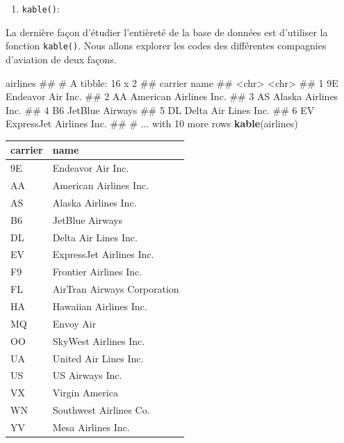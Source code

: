 \documentclass[]{book}
\newenvironment{Shaded}{\begin{snugshade}}{\end{snugshade}}
\newcommand{\KeywordTok}[1]{\textcolor[rgb]{0.13,0.29,0.53}{\textbf{#1}}}
\newcommand{\NormalTok}[1]{#1}
\providecommand{\tightlist}{%
  \setlength{\itemsep}{0pt}\setlength{\parskip}{0pt}}
\theoremstyle{definition}
\theoremstyle{definition}
\theoremstyle{definition}
\theoremstyle{remark}
\begin{document}
\begin{enumerate}
\def\labelenumi{\arabic{enumi}.}
\setcounter{enumi}{2}
\tightlist
\item
  \texttt{kable()}:
\end{enumerate}

La dernière façon d'étudier l'entièreté de la base de données est
d'utiliser la fonction \texttt{kable()}. Nous allons explorer les codes
des différentes compagnies d'aviation de deux façons.

\begin{Shaded}
\begin{Highlighting}[]
\NormalTok{airlines}
\NormalTok{## # A tibble: 16 x 2}
\NormalTok{##   carrier name                    }
\NormalTok{##   <chr>   <chr>                   }
\NormalTok{## 1 9E      Endeavor Air Inc.       }
\NormalTok{## 2 AA      American Airlines Inc.  }
\NormalTok{## 3 AS      Alaska Airlines Inc.    }
\NormalTok{## 4 B6      JetBlue Airways         }
\NormalTok{## 5 DL      Delta Air Lines Inc.    }
\NormalTok{## 6 EV      ExpressJet Airlines Inc.}
\NormalTok{## # ... with 10 more rows}
\KeywordTok{kable}\NormalTok{(airlines)}
\end{Highlighting}
\end{Shaded}

\begin{tabular}{l|l}
\hline
carrier & name\\
\hline
9E & Endeavor Air Inc.\\
\hline
AA & American Airlines Inc.\\
\hline
AS & Alaska Airlines Inc.\\
\hline
B6 & JetBlue Airways\\
\hline
DL & Delta Air Lines Inc.\\
\hline
EV & ExpressJet Airlines Inc.\\
\hline
F9 & Frontier Airlines Inc.\\
\hline
FL & AirTran Airways Corporation\\
\hline
HA & Hawaiian Airlines Inc.\\
\hline
MQ & Envoy Air\\
\hline
OO & SkyWest Airlines Inc.\\
\hline
UA & United Air Lines Inc.\\
\hline
US & US Airways Inc.\\
\hline
VX & Virgin America\\
\hline
WN & Southwest Airlines Co.\\
\hline
YV & Mesa Airlines Inc.\\
\hline
\end{tabular}
\end{document}
